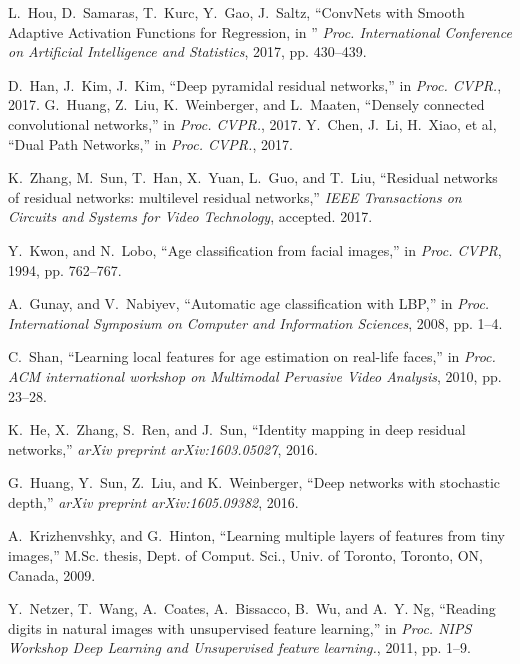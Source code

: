 \documentclass[journal]{IEEEtran}
\begin{document}
\begin{thebibliography}{1}
L.~Hou, D.~Samaras, T.~Kurc, Y.~Gao, J.~Saltz, ``ConvNets with Smooth Adaptive Activation Functions for Regression, in '' \emph{Proc. International Conference on Artificial Intelligence and Statistics}, 2017, pp. 430--439.


D.~Han, J.~Kim, J.~Kim, ``Deep pyramidal residual networks,'' in \emph{Proc. CVPR.}, 2017.
G.~Huang, Z.~Liu, K.~Weinberger, and L.~Maaten, ``Densely connected convolutional networks,'' in \emph{Proc. CVPR.}, 2017.
Y.~Chen, J.~Li, H.~Xiao, et al, ``Dual Path Networks,'' in \emph{Proc. CVPR.}, 2017.



K.~Zhang, M.~Sun, T.~Han, X.~Yuan, L.~Guo, and T.~Liu, ``Residual networks of residual networks: multilevel residual networks,'' \emph{IEEE Transactions on Circuits and Systems for Video Technology}, accepted. 2017.

Y.~Kwon, and N.~Lobo, ``Age classification from facial images,'' in \emph{Proc. CVPR}, 1994, pp. 762--767.

A.~Gunay, and V.~Nabiyev, ``Automatic age classification with LBP,'' in \emph{Proc. International Symposium on Computer and Information Sciences}, 2008, pp. 1--4.

C.~Shan, ``Learning local features for age estimation on real-life faces,'' in \emph{Proc. ACM international workshop on Multimodal Pervasive Video Analysis}, 2010, pp. 23--28.





K.~He, X.~Zhang, S.~Ren, and J.~Sun, ``Identity mapping in deep residual networks,'' \emph{arXiv preprint arXiv:1603.05027}, 2016. 

G.~Huang, Y.~Sun, Z.~Liu, and K.~Weinberger, ``Deep networks with stochastic depth,'' \emph{arXiv preprint arXiv:1605.09382}, 2016. 

A.~Krizhenvshky, and G.~Hinton, ``Learning multiple layers of features from tiny images,'' M.Sc. thesis, Dept. of Comput. Sci., Univ. of Toronto, Toronto, ON, Canada, 2009.

Y.~Netzer, T.~Wang, A.~Coates, A.~Bissacco, B.~Wu, and A.~Y. Ng, ``Reading digits in natural images with unsupervised feature learning,'' in
  \emph{Proc. NIPS Workshop Deep Learning and Unsupervised feature learning.}, 2011, pp. 1--9.


\end{thebibliography}
\end{document}
